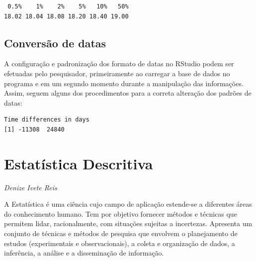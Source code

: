 \documentclass[12pt,brazil,oneside]{book}
\newenvironment{Shaded}{\begin{snugshade}}{\end{snugshade}}
\newcommand{\CommentTok}[1]{\textcolor[rgb]{0.56,0.35,0.01}{\textit{#1}}}
\newcommand{\DataTypeTok}[1]{\textcolor[rgb]{0.13,0.29,0.53}{#1}}
\newcommand{\KeywordTok}[1]{\textcolor[rgb]{0.13,0.29,0.53}{\textbf{#1}}}
\newcommand{\NormalTok}[1]{#1}
\newcommand{\OperatorTok}[1]{\textcolor[rgb]{0.81,0.36,0.00}{\textbf{#1}}}
\newcommand{\StringTok}[1]{\textcolor[rgb]{0.31,0.60,0.02}{#1}}
\begin{document}
\begin{verbatim}
 0.5%    1%    2%    5%   10%   50% 
18.02 18.04 18.08 18.20 18.40 19.00 
\end{verbatim}

\hypertarget{conversao-de-datas}{%
\section{Conversão de datas}\label{conversao-de-datas}}

A configuração e padronização dos formato de datas no RStudio podem ser
efetuadas pelo pesquisador, primeiramente ao carregar a base de dados no
programa e em um segundo momento durante a manipulação das informações.
Assim, seguem alguns dos procedimentos para a correta alteração dos
padrões de datas:

\begin{Shaded}
\end{Shaded}

\begin{verbatim}
Time differences in days
[1] -11308  24840
\end{verbatim}

\hypertarget{estatistica-descritiva}{%
\chapter{Estatística Descritiva}\label{estatistica-descritiva}}

\begin{flushright}
\emph{Denize Ivete Reis}
\end{flushright}

A Estatística é uma ciência cujo campo de aplicação estende-se a
diferentes áreas do conhecimento humano. Tem por objetivo fornecer
métodos e técnicas que permitem lidar, racionalmente, com situações
sujeitas a incertezas. Apresenta um conjunto de técnicas e métodos de
pesquisa que envolvem o planejamento de estudos (experimentais e
observacionais), a coleta e organização de dados, a inferência, a
análise e a disseminação de informação.
\end{document}
